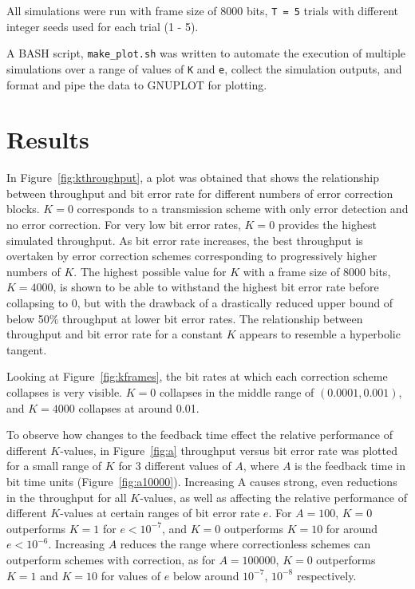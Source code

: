 \documentclass[twocolumn]{article}
\begin{document}
    All simulations were run with frame size of 8000 bits, \verb|T = 5| trials with
    different integer seeds used for each trial (1 - 5).

    A BASH script, \verb|make_plot.sh| was written to automate the execution of multiple 
    simulations over a range of values of \verb|K| and \verb|e|, collect the simulation 
    outputs, and format and pipe the data to GNUPLOT for plotting.


\section*{Results}

    In Figure~\ref{fig:kthroughput}, a plot was obtained that shows the relationship between 
    throughput and bit error rate for different numbers of error correction blocks. $K=0$ 
    corresponds to a transmission scheme with only error detection and no error correction.
    For very low bit error rates, $K=0$ provides the highest simulated throughput. As bit 
    error rate increases, the best throughput is overtaken by error correction schemes 
    corresponding to progressively higher numbers of $K$. The highest possible value for 
    $K$ with a frame size of 8000 bits, $K=4000$, is shown to be able to withstand the highest
    bit error rate before collapsing to 0, but with the drawback of a drastically reduced upper
    bound of below 50\% throughput at lower bit error rates. The relationship between
    throughput and bit error rate for a constant $K$ appears to resemble a hyperbolic tangent.

    Looking at Figure~\ref{fig:kframes}, the bit rates at which each correction scheme 
    collapses is very visible. $K=0$ collapses in the middle range of $(0.0001, 0.001)$, and
    $K=4000$ collapses at around 0.01.

    To observe how changes to the feedback time effect the relative performance of different
    $K$-values, in Figure~\ref{fig:a} throughput versus bit error rate was plotted for a 
    small range of $K$ for 3 different values of $A$, where $A$ is the feedback time in bit
    time units (Figure~\ref{fig:a10000}). Increasing A causes strong, even reductions in the 
    throughput for all $K$-values, as well as affecting the relative performance of different 
    $K$-values at certain ranges of bit error rate $e$. For $A=100$, $K=0$ outperforms $K=1$ 
    for $e < 10^{-7}$,
    and $K=0$ outperforms $K=10$ for around $e < 10^{-6}$. Increasing $A$ reduces the range where
    correctionless schemes can outperform schemes with correction, as for $A=100000$, $K=0$ 
    outperforms $K=1$ and $K=10$ for values of $e$ below around $10^{-7}$, $10^{-8}$ 
    respectively.
\end{document}
